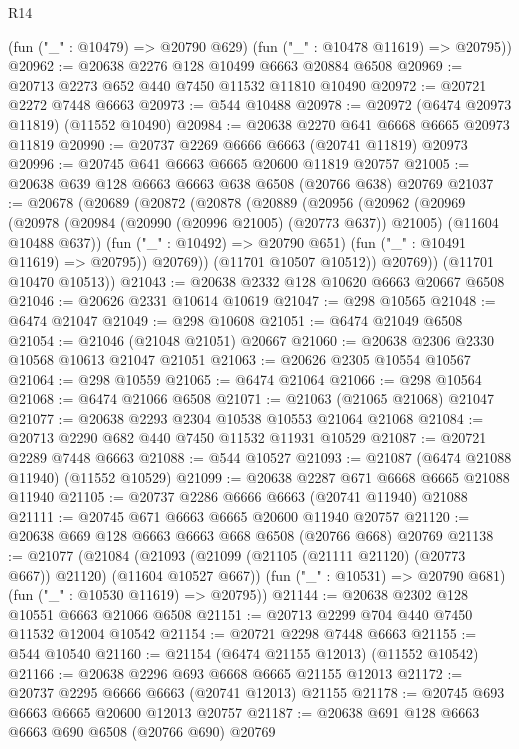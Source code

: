 \begin{lexlean}{R14}
\begin{coremodule}
{{{{{{{{{{{{{{{{{{{{{{{{{{{{{{{{{{{{{{{{{{{{{{{{{{{{{{{{{{{{{{{{{{{{{{{{{{{{{{{{{{      (fun ("_" : @10479) => @20790 @629)
      (fun ("_" : @10478 @11619) => @20795))
@20962 := @20638 @2276 @128 @10499 @6663 @20884 @6508
@20969 := @20713 @2273 @652 @440 @7450 @11532 @11810 @10490
@20972 := @20721 @2272 @7448 @6663
@20973 := @544 @10488
@20978 := @20972 (@6474 @20973 @11819) (@11552 @10490)
@20984 := @20638 @2270 @641 @6668 @6665 @20973 @11819
@20990 := @20737 @2269 @6666 @6663 (@20741 @11819) @20973
@20996 := @20745 @641 @6663 @6665 @20600 @11819 @20757
@21005 := @20638 @639 @128 @6663 @6663 @638 @6508 (@20766 @638) @20769
@21037 := @20678
    (@20689
      (@20872
        (@20878
          (@20889
            (@20956
              (@20962
                (@20969
                  (@20978
                    (@20984 (@20990 (@20996 @21005) (@20773 @637)) @21005)
                    (@11604 @10488 @637))
                  (fun ("_" : @10492) => @20790 @651)
                  (fun ("_" : @10491 @11619) => @20795))
                @20769))
            (@11701 @10507 @10512))
          @20769))
      (@11701 @10470 @10513))
@21043 := @20638 @2332 @128 @10620 @6663 @20667 @6508
@21046 := @20626 @2331 @10614 @10619
@21047 := @298 @10565
@21048 := @6474 @21047
@21049 := @298 @10608
@21051 := @6474 @21049 @6508
@21054 := @21046 (@21048 @21051) @20667
@21060 := @20638 @2306 @2330 @10568 @10613 @21047 @21051
@21063 := @20626 @2305 @10554 @10567
@21064 := @298 @10559
@21065 := @6474 @21064
@21066 := @298 @10564
@21068 := @6474 @21066 @6508
@21071 := @21063 (@21065 @21068) @21047
@21077 := @20638 @2293 @2304 @10538 @10553 @21064 @21068
@21084 := @20713 @2290 @682 @440 @7450 @11532 @11931 @10529
@21087 := @20721 @2289 @7448 @6663
@21088 := @544 @10527
@21093 := @21087 (@6474 @21088 @11940) (@11552 @10529)
@21099 := @20638 @2287 @671 @6668 @6665 @21088 @11940
@21105 := @20737 @2286 @6666 @6663 (@20741 @11940) @21088
@21111 := @20745 @671 @6663 @6665 @20600 @11940 @20757
@21120 := @20638 @669 @128 @6663 @6663 @668 @6508 (@20766 @668) @20769
@21138 := @21077
    (@21084
      (@21093 (@21099 (@21105 (@21111 @21120) (@20773 @667)) @21120) (@11604 @10527 @667))
      (fun ("_" : @10531) => @20790 @681)
      (fun ("_" : @10530 @11619) => @20795))
@21144 := @20638 @2302 @128 @10551 @6663 @21066 @6508
@21151 := @20713 @2299 @704 @440 @7450 @11532 @12004 @10542
@21154 := @20721 @2298 @7448 @6663
@21155 := @544 @10540
@21160 := @21154 (@6474 @21155 @12013) (@11552 @10542)
@21166 := @20638 @2296 @693 @6668 @6665 @21155 @12013
@21172 := @20737 @2295 @6666 @6663 (@20741 @12013) @21155
@21178 := @20745 @693 @6663 @6665 @20600 @12013 @20757
@21187 := @20638 @691 @128 @6663 @6663 @690 @6508 (@20766 @690) @20769
}}}}}}}}}}}}}}}}}}}}}}}}}}}}}}}}}}}}}}}}}}}}}}}}}}}}}}}}}}}}}}}}}}}}}}}}}}}}}}}}}}
\end{coremodule}
\end{lexlean}
